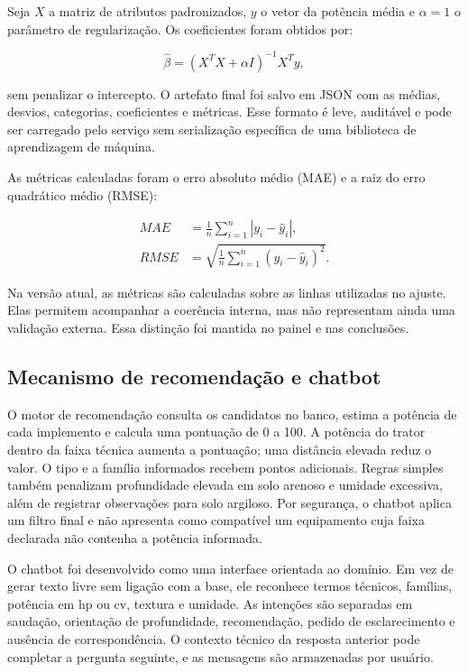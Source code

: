 \documentclass[12pt,a4paper]{article}
\begin{document}
Seja $X$ a matriz de atributos padronizados, $y$ o vetor da potência média e $\alpha=1$ o parâmetro de regularização. Os coeficientes foram obtidos por:

\begin{equation}
  \hat{\beta} = (X^{T}X + \alpha I)^{-1}X^{T}y,
\end{equation}

sem penalizar o intercepto. O artefato final foi salvo em JSON com as médias, desvios, categorias, coeficientes e métricas. Esse formato é leve, auditável e pode ser carregado pelo serviço sem serialização específica de uma biblioteca de aprendizagem de máquina.

As métricas calculadas foram o erro absoluto médio (MAE) e a raiz do erro quadrático médio (RMSE):

\begin{align}
  MAE &= \frac{1}{n}\sum_{i=1}^{n}\left|y_i-\hat{y}_i\right|,\\
  RMSE &= \sqrt{\frac{1}{n}\sum_{i=1}^{n}(y_i-\hat{y}_i)^2}.
\end{align}

Na versão atual, as métricas são calculadas sobre as linhas utilizadas no ajuste. Elas permitem acompanhar a coerência interna, mas não representam ainda uma validação externa. Essa distinção foi mantida no painel e nas conclusões.

\subsection{Mecanismo de recomendação e chatbot}

O motor de recomendação consulta os candidatos no banco, estima a potência de cada implemento e calcula uma pontuação de 0 a 100. A potência do trator dentro da faixa técnica aumenta a pontuação; uma distância elevada reduz o valor. O tipo e a família informados recebem pontos adicionais. Regras simples também penalizam profundidade elevada em solo arenoso e umidade excessiva, além de registrar observações para solo argiloso. Por segurança, o chatbot aplica um filtro final e não apresenta como compatível um equipamento cuja faixa declarada não contenha a potência informada.

O chatbot foi desenvolvido como uma interface orientada ao domínio. Em vez de gerar texto livre sem ligação com a base, ele reconhece termos técnicos, famílias, potência em hp ou cv, textura e umidade. As intenções são separadas em saudação, orientação de profundidade, recomendação, pedido de esclarecimento e ausência de correspondência. O contexto técnico da resposta anterior pode completar a pergunta seguinte, e as mensagens são armazenadas por usuário.
\end{document}
